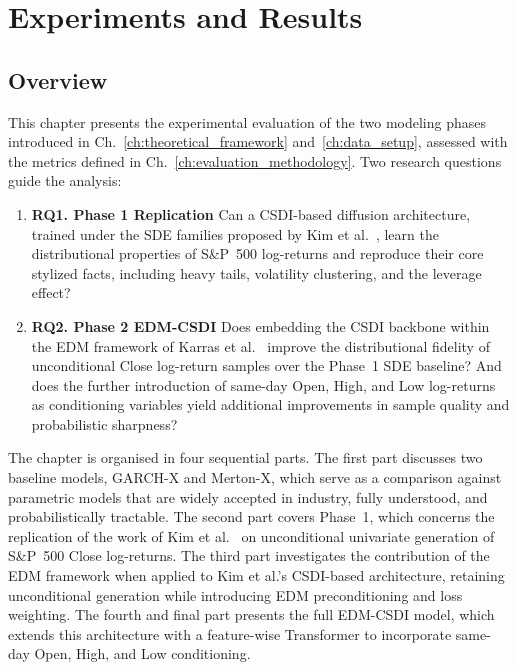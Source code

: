 \chapter{Experiments and Results}
\label{ch:experiments_results}

\section{Overview}
\label{sec:exp_introduction}
This chapter presents the experimental evaluation of the two modeling phases introduced
in Ch.\ \ref{ch:theoretical_framework} and\ \ref{ch:data_setup}, assessed with the
metrics defined in Ch.\ \ref{ch:evaluation_methodology}. Two research questions guide
the analysis:

\begin{enumerate}
    \item \textbf{RQ1. Phase 1 \textemdash{} Replication} \quad Can a CSDI-based diffusion architecture, trained under the SDE families proposed by Kim et al.\ \cite{kim2025diffusion}, learn the distributional properties of S\&P~500 log-returns and reproduce their core stylized facts, including heavy tails, volatility clustering, and the leverage effect?
    \item \textbf{RQ2. Phase 2 \textemdash{} EDM-CSDI} \quad Does embedding the CSDI backbone within the EDM framework of Karras et al.\ \cite{karras2022elucidating} improve the distributional fidelity of unconditional Close log-return samples over the Phase~1 SDE baseline? And does the further introduction of same-day Open, High, and Low log-returns as conditioning variables yield additional improvements in sample quality and probabilistic sharpness?
\end{enumerate}

The chapter is organised in four sequential parts. The first part discusses two baseline models, GARCH-X and Merton-X, which serve as a comparison against parametric models that are widely accepted in industry, fully understood, and probabilistically tractable. The second part covers Phase~1, which concerns the replication of the work of Kim et al.\ \cite{kim2025diffusion} on unconditional univariate generation of S\&P~500 Close log-returns. The third part investigates the contribution of the EDM framework when applied to Kim et al.'s CSDI-based architecture, retaining unconditional generation while introducing EDM preconditioning and loss weighting. The fourth and final part presents the full EDM-CSDI model, which extends this architecture with a feature-wise Transformer to incorporate same-day Open, High, and Low conditioning.

